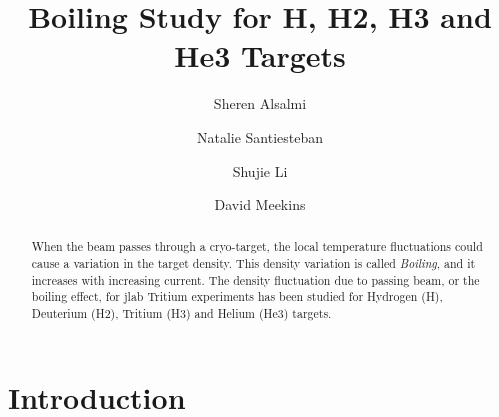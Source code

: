 \documentclass[preprint,12pt]{elsarticle}
\begin{document}
\begin{frontmatter}



\title{Boiling Study for H, H2, H3 and He3 Targets}

\author[Kent]{Sheren Alsalmi}
\author[UNH]{Natalie Santiesteban}
\author[UNH]{Shujie Li}
\author[JLab]{David Meekins}

\address[Kent]{Kent State University}
\address[UNH]{University of New Hampshire}
\address[JLab]{Jefferson Lab}

\begin{abstract}
When the beam passes through a cryo-target, the local temperature fluctuations could 
cause a variation in the target density. This density variation is called \emph{Boiling}, 
and it increases with increasing current. The density fluctuation due to passing beam, 
or the boiling effect, for jlab Tritium experiments has been studied for Hydrogen (H), 
Deuterium (H2), Tritium (H3) and Helium (He3) targets.\par
\end{abstract}

\begin{keyword}

\end{keyword}
\end{frontmatter}


\section{Introduction}
\label{}
\end{document}
